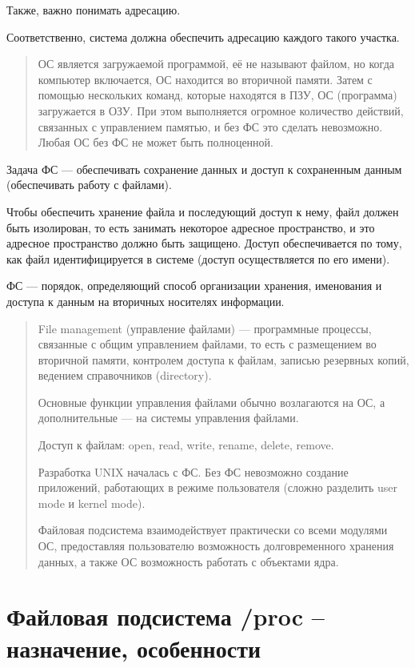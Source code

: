 Также, важно понимать адресацию. 

Соответственно, система должна обеспечить адресацию каждого такого участка.

\begin{quote}
	ОС является загружаемой программой, её не называют файлом, но когда компьютер включается, ОС находится во вторичной памяти. Затем с помощью нескольких команд, которые находятся в ПЗУ, ОС (программа) загружается в ОЗУ. При этом выполняется огромное количество действий, связанных с управлением памятью, и без ФС это сделать невозможно. Любая ОС без ФС не может быть полноценной.
\end{quote}

Задача ФС --- обеспечивать сохранение данных и доступ к сохраненным данным (обеспечивать работу с файлами).

Чтобы обеспечить хранение файла и последующий доступ к нему, файл должен быть изолирован, то есть занимать некоторое адресное пространство, и это адресное пространство должно быть защищено. Доступ обеспечивается по тому, как файл идентифицируется в системе (доступ осуществляется по его имени).

ФС --- порядок, определяющий способ организации хранения, именования и доступа к данным на вторичных носителях информации.

\begin{quote}
	File management (управление файлами) --- программные процессы, связанные с общим управлением файлами, то есть с размещением во вторичной памяти, контролем доступа к файлам, записью резервных копий, ведением справочников (directory).
	
	Основные функции управления файлами обычно возлагаются на ОС, а дополнительные --- на системы управления файлами.
	
	Доступ к файлам: open, read, write, rename, delete, remove.
	
	Разработка UNIX началась с ФС. Без ФС невозможно создание приложений, работающих в режиме пользователя (сложно разделить user mode и kernel mode).
	
	Файловая подсистема взаимодействует практически со всеми модулями ОС, предоставляя пользователю возможность долговременного хранения данных, а также ОС возможность работать с объектами ядра.
\end{quote}

\section{Файловая подсистема /proc -- назначение, особенности}

